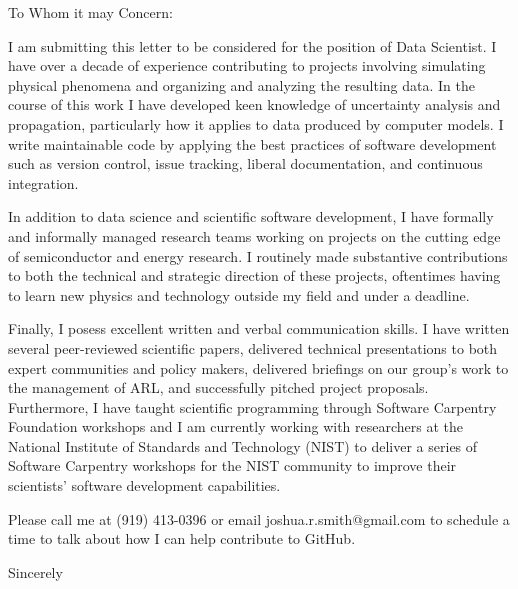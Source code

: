 \documentclass[letterpaper,10pt]{letter}
\begin{document}

\begin{letter}{}

\address{2515 13th St NW\\
         Apt. 510\\
         Washington, DC 20009}

\opening{To Whom it may Concern:}

I am submitting this letter to be considered for the position of Data Scientist.
I have over a decade of experience contributing to projects involving simulating physical phenomena and organizing and analyzing the resulting data.
In the course of this work I have developed keen knowledge of uncertainty analysis and propagation, particularly how it applies to data produced by computer models.
I write maintainable code by applying the best practices of software development such as version control, issue tracking, liberal documentation, and continuous integration.


In addition to data science and scientific software development, I have formally and informally managed research teams working on projects on the cutting edge of semiconductor and energy research.
I routinely made substantive contributions to both the technical and strategic direction of these projects, oftentimes having to learn new physics and technology outside my field and under a deadline.


Finally, I posess excellent written and verbal communication skills.
I have written several peer-reviewed scientific papers, delivered technical presentations to both expert communities and policy makers, delivered briefings on our group's work to the management of ARL, and successfully pitched project proposals.
Furthermore, I have taught scientific programming through Software Carpentry Foundation workshops and I am currently working with researchers at the National Institute of Standards and Technology (NIST) to deliver a series of Software Carpentry workshops for the NIST community to improve their scientists' software development capabilities.


Please call me at (919) 413-0396 or email joshua.r.smith@gmail.com to schedule a time to talk about how I can help contribute to GitHub.


\signature{Joshua Ryan Smith}

\closing{Sincerely}


\end{letter}
\end{document}
